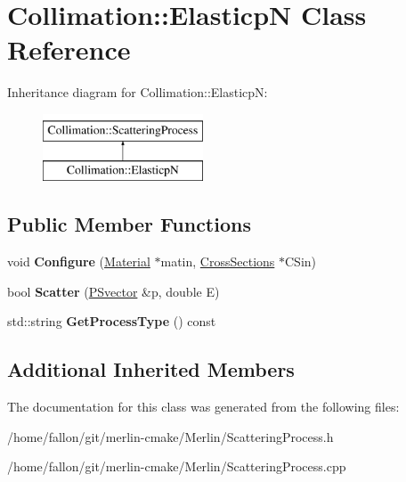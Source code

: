 \hypertarget{classCollimation_1_1ElasticpN}{}\section{Collimation\+:\+:ElasticpN Class Reference}
\label{classCollimation_1_1ElasticpN}
Inheritance diagram for Collimation\+:\+:ElasticpN\+:\begin{figure}[H]
\begin{center}
\leavevmode
\includegraphics[height=2.000000cm]{classCollimation_1_1ElasticpN}
\end{center}
\end{figure}
\subsection*{Public Member Functions}
\begin{DoxyCompactItemize}
\item 
\mbox{\label{classCollimation_1_1ElasticpN_accb8e381e0c880d0b4c6fa62d98c83c4}} 
void {\bfseries Configure} (\hyperlink{classMaterial}{Material} $\ast$matin, \hyperlink{classCollimation_1_1CrossSections}{Cross\+Sections} $\ast$C\+Sin)
\item 
\mbox{\label{classCollimation_1_1ElasticpN_a8b912ff2801930f895ae26ad03e356d6}} 
bool {\bfseries Scatter} (\hyperlink{classPSvector}{P\+Svector} \&p, double E)
\item 
\mbox{\label{classCollimation_1_1ElasticpN_ae6850b1195f075ba5115e02acdb72e27}} 
std\+::string {\bfseries Get\+Process\+Type} () const
\end{DoxyCompactItemize}
\subsection*{Additional Inherited Members}


The documentation for this class was generated from the following files\+:\begin{DoxyCompactItemize}
\item 
/home/fallon/git/merlin-\/cmake/\+Merlin/Scattering\+Process.\+h\item 
/home/fallon/git/merlin-\/cmake/\+Merlin/Scattering\+Process.\+cpp\end{DoxyCompactItemize}
